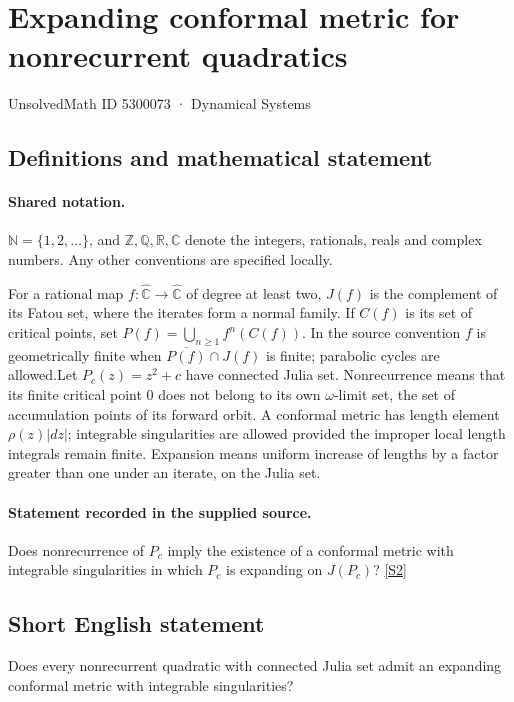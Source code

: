 \documentclass[11pt]{article}
\newcommand{\sref}[2]{\hyperlink{source:#1:#2}{[S#2]}}
\begin{document}
\setcounter{section}{5300072}
\section{Expanding conformal metric for nonrecurrent quadratics}\label{5300073}
{\small\sffamily UnsolvedMath ID 5300073 · Dynamical Systems}
\subsection{Definitions and mathematical statement}

\paragraph{Shared notation.}$\mathbb N=\{1,2,\ldots\}$, and $\mathbb Z,\mathbb Q,\mathbb R,\mathbb C$ denote the integers, rationals, reals and complex numbers. Any other conventions are specified locally.


For a rational map $f:\widehat{\mathbb C}\to\widehat{\mathbb C}$ of degree at least two, $J(f)$ is the complement of its Fatou set, where the iterates form a normal family. If $C(f)$ is its set of critical points, set $P(f)=\bigcup_{n\geq1}f^n(C(f))$. In the source convention $f$ is geometrically finite when $\overline{P(f)}\cap J(f)$ is finite; parabolic cycles are allowed.Let $P_c(z)=z^2+c$ have connected Julia set. Nonrecurrence means that its finite critical point $0$ does not belong to its own $\omega$-limit set, the set of accumulation points of its forward orbit. A conformal metric has length element $\rho(z)|dz|$; integrable singularities are allowed provided the improper local length integrals remain finite. Expansion means uniform increase of lengths by a factor greater than one under an iterate, on the Julia set.
\paragraph{Statement recorded in the supplied source.}
Does nonrecurrence of $P_c$ imply the existence of a conformal metric with integrable singularities in which $P_c$ is expanding on $J(P_c)$? \sref{5300073}{2}
\subsection{Short English statement}
Does every nonrecurrent quadratic with connected Julia set admit an expanding conformal metric with integrable singularities?
\end{document}
